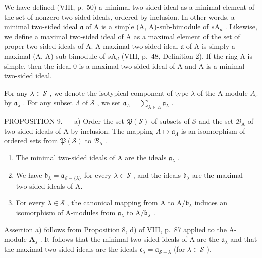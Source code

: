 We have defined (VIII, p.~50) a minimal two-sided ideal as a minimal element of the set of nonzero two-sided ideals, ordered by inclusion. In other words, a minimal two-sided ideal \(\mathfrak{a}\) of A is a simple (A, A)-sub-bimodule of \(s\mathrm{A}_d\) . Likewise, we define a maximal two-sided ideal of A as a maximal element of the set of proper two-sided ideals of A. A maximal two-sided ideal \(\mathfrak{a}\) of A is simply a maximal (A, A)-sub-bimodule of \(s\mathrm{A}_d\) (VIII, p.~48, Definition 2). If the ring A is simple, then the ideal 0 is a maximal two-sided ideal of A and A is a minimal two-sided ideal.

For any \(\lambda \in \mathcal{S}\) , we denote the isotypical component of type \(\lambda\) of the A-module \(A_s\) by \(\mathfrak{a}_{\lambda}\) . For any subset \(\Lambda\) of \(\mathcal{S}\) , we set \(\mathfrak{a}_{\Lambda} = \sum_{\lambda \in \Lambda} \mathfrak{a}_{\lambda}\) .

PROPOSITION 9. --- a) Order the set \(\mathfrak{P}(\mathcal{S})\) of subsets of \(\mathcal{S}\) and the set \(\mathcal{B}_{\mathrm{A}}\) of two-sided ideals of A by inclusion. The mapping \(\Lambda \mapsto \mathfrak{a}_{\Lambda}\) is an isomorphism of ordered sets from \(\mathfrak{P}(\mathcal{S})\) to \(\mathcal{B}_{\mathrm{A}}\) .

\begin{enumerate}
\def\labelenumi{\alph{enumi})}
\setcounter{enumi}{1}
\item
  The minimal two-sided ideals of A are the ideals \(\mathfrak{a}_{\lambda}\) .
\item
  We have \(\mathfrak{b}_{\lambda} = \mathfrak{a}_{\mathcal{S} - \{\lambda\}}\) for every \(\lambda \in \mathcal{S}\) , and the ideals \(\mathfrak{b}_{\lambda}\) are the maximal two-sided ideals of A.
\item
  For every \(\lambda \in \mathcal{S}\) , the canonical mapping from A to \(\mathrm{A} / \mathfrak{b}_{\lambda}\) induces an isomorphism of A-modules from \(\mathfrak{a}_{\lambda}\) to \(\mathrm{A} / \mathfrak{b}_{\lambda}\) .
\end{enumerate}

Assertion a) follows from Proposition 8, d) of VIII, p.~87 applied to the A-module \(\mathbf{A}_s\) . It follows that the minimal two-sided ideals of A are the \(\mathfrak{a}_{\lambda}\) and that the maximal two-sided ideals are the ideals \(\mathfrak{c}_{\lambda} = \mathfrak{a}_{\mathcal{S} - \lambda}\) (for \(\lambda \in \mathcal{S}\) ).

